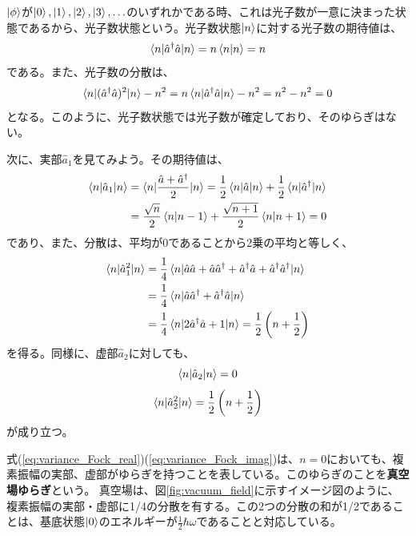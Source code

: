 $\ket \phi$が$\ket 0, \ket 1, \ket 2, \ket 3, \hdots$のいずれかである時、これは光子数が一意に決まった状態であるから、光子数状態という。光子数状態$\ket n$に対する光子数の期待値は、
\begin{equation}
  \braket{n|\hat a^\dagger \hat a|n} = n\braket{n|n} = n
\end{equation}
である。また、光子数の分散は、
\begin{equation}
\braket{n|(\hat a^\dagger \hat a)^2|n} - n^2 = n\braket{n|\hat a^\dagger \hat a|n} - n^2 = n^2 - n^2 = 0  
\end{equation}
となる。このように、光子数状態では光子数が確定しており、そのゆらぎはない。

次に、実部$\hat a_1$を見てみよう。その期待値は、
\begin{equation}
\begin{aligned}
  \braket{n|\hat a_1|n} &= \braket{n|\frac{\hat a + \hat a^\dagger}{2}|n} = \frac 1 2 \braket{n|\hat a|n} + \frac{1}{2}\braket{n|\hat a^\dagger|n}\\
  &= \frac{\sqrt n}{2}\braket{n|n-1} + \frac{\sqrt{n + 1}}{2}\braket{n|n+1} = 0
\end{aligned}
\end{equation}
であり、また、分散は、平均が0であることから2乗の平均と等しく、
\begin{equation}
\begin{aligned}
  \braket{n|\hat a_1^2|n} &= \frac{1}{4}\braket{n|\hat a\hat a+\hat a \hat a^\dagger + \hat a^\dagger \hat a + \hat a^\dagger \hat a^\dagger|n} \\
  &= \frac{1}{4}\braket{n|\hat a \hat a^\dagger + \hat a^\dagger \hat a|n}\\
  &= \frac{1}{4}\braket{n|2\hat a^\dagger \hat a + 1|n} = \frac{1}{2}\left(n + \frac 1 2\right)  
  \label{eq:variance_Fock_real}
\end{aligned}
\end{equation}
を得る。同様に、虚部$\hat a_2$に対しても、
\begin{equation}
  \braket{n|\hat a_2|n} = 0
\end{equation}
\begin{equation}
  \braket{n|\hat a_2^2|n} = \frac{1}{2}\left(n + \frac 1 2\right)
  \label{eq:variance_Fock_imag}
\end{equation}
が成り立つ。

式(\ref{eq:variance_Fock_real})(\ref{eq:variance_Fock_imag})は、$n = 0$においても、複素振幅の実部、虚部がゆらぎを持つことを表している。このゆらぎのことを\textbf{真空場ゆらぎ}という。
真空場は、図\ref{fig:vacuum_field}に示すイメージ図のように、複素振幅の実部・虚部に1/4の分散を有する。この2つの分散の和が1/2であることは、基底状態$\ket 0$のエネルギーが$\frac 1 2 \hbar \omega$であることと対応している。

